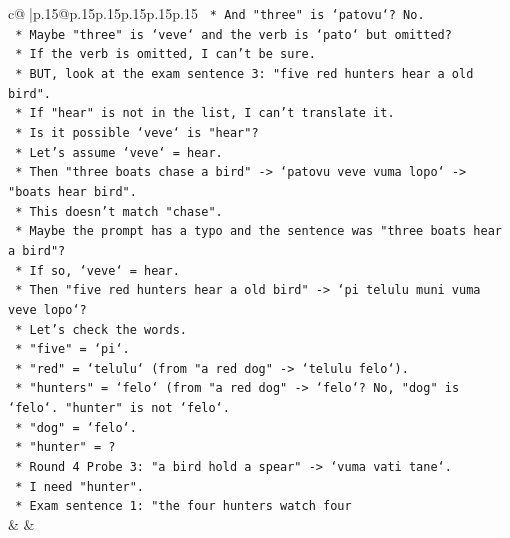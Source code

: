 \documentclass{article}
\begin{document}
{\begin{supertabular}{c@{$\;$}|p{.15\linewidth}@{}p{.15\linewidth}p{.15\linewidth}p{.15\linewidth}p{.15\linewidth}p{.15\linewidth}}
{{{\texttt{                        *   And "three" is `patovu`? No.} \\
\texttt{                        *   Maybe "three" is `veve` and the verb is `pato` but omitted?} \\
\texttt{                        *   If the verb is omitted, I can't be sure.} \\
\texttt{                        *   BUT, look at the exam sentence 3: "five red hunters hear a old bird".} \\
\texttt{                        *   If "hear" is not in the list, I can't translate it.} \\
\texttt{                        *   Is it possible `veve` is "hear"?} \\
\texttt{                        *   Let's assume `veve` = hear.} \\
\texttt{                        *   Then "three boats chase a bird" {-}> `patovu veve vuma lopo` {-}> "boats hear bird".} \\
\texttt{                        *   This doesn't match "chase".} \\
\texttt{                        *   Maybe the prompt has a typo and the sentence was "three boats hear a bird"?} \\
\texttt{                        *   If so, `veve` = hear.} \\
\texttt{                        *   Then "five red hunters hear a old bird" {-}> `pi telulu muni vuma veve lopo`?} \\
\texttt{                        *   Let's check the words.} \\
\texttt{                        *   "five" = `pi`.} \\
\texttt{                        *   "red" = `telulu` (from "a red dog" {-}> `telulu felo`).} \\
\texttt{                        *   "hunters" = `felo` (from "a red dog" {-}> `felo`? No, "dog" is `felo`. "hunter" is not `felo`.} \\
\texttt{                        *   "dog" = `felo`.} \\
\texttt{                        *   "hunter" = ?} \\
\texttt{                        *   Round 4 Probe 3: "a bird hold a spear" {-}> `vuma vati tane`.} \\
\texttt{                        *   I need "hunter".} \\
\texttt{                        *   Exam sentence 1: "the four hunters watch four} \\
            }
        }
    }
    & & \\ \\


\end{supertabular}}
\end{document}
